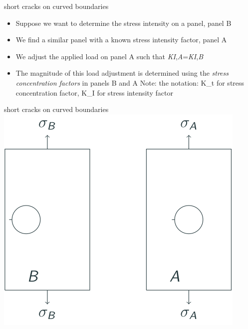 \documentclass[
  letterpaper,
  ignorenonframetext,
  aspectratio=43,
  handout,
  12pt]{beamer}
\providecommand{\tightlist}{%
  \setlength{\itemsep}{0pt}\setlength{\parskip}{0pt}}
\providecommand{\tightlist}{%
\setlength{\itemsep}{0pt}\setlength{\parskip}{0pt}}
\let\Oldincludegraphics\includegraphics
\renewcommand{\includegraphics}[2][]{\Oldincludegraphics[width=\textwidth,height=0.7\textheight,keepaspectratio]{#2}}
\begin{document}
\begin{frame}{short cracks on curved boundaries}
\protect\hypertarget{short-cracks-on-curved-boundaries-1}{}
\begin{itemize}
\tightlist
\item
  Suppose we want to determine the stress intensity on a panel, panel B
\item
  We find a similar panel with a known stress intensity factor, panel A
\item
  We adjust the applied load on panel A such that
  \emph{K}\emph{I},\emph{A}=\emph{K}\emph{I},\emph{B}
\item
  The magnitude of this load adjustment is determined using the
  \emph{stress concentration factors} in panels B and A Note: the
  notation: K\_t for stress concentration factor, K\_I for stress
  intensity factor
\end{itemize}
\end{frame}

\begin{frame}{short cracks on curved boundaries}
\protect\hypertarget{short-cracks-on-curved-boundaries-2}{}
\includegraphics{../images/curved-short.svg}
\end{frame}
\end{document}
